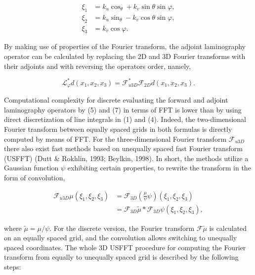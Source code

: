 \documentclass{article}
\begin{document}
\begin{equation}
\begin{aligned} \xi_1 &= k_u \cos_{\theta} + k_v \sin \theta \sin \varphi, \\ \xi_2 &= k_u \sin_{\theta} - k_v \cos \theta \sin \varphi, \\ \xi_3 &= k_v \cos \varphi. \end{aligned}
\tag{6}
\end{equation}

By making use of properties of the Fourier transform, the adjoint laminography operator can be calculated by replacing the 2D and 3D Fourier transforms with their adjoints and with reversing the operators order, namely,

\begin{equation}
\mathcal{L}_\varphi^* d(x_1, x_2, x_3) = \mathcal{F}_{u3D}^* \mathcal{F}_{2D} d(x_1, x_2, x_3).
\tag{7}
\end{equation}

Computational complexity for discrete evaluating the forward and adjoint laminography operators by (5) and (7) in terms of FFT is lower than by using direct discretization of line integrals in (1) and (4). Indeed, the two-dimensional Fourier transform between equally spaced grids in both formulas is directly computed by means of FFT. For the three-dimensional Fourier transform $\mathcal{F}_{u3D}$ there also exist fast methods based on unequally spaced fast Fourier transform (USFFT) (Dutt \& Rokhlin, 1993; Beylkin, 1998). In short, the methods utilize a Gaussian function $\psi$ exhibiting certain properties, to rewrite the transform in the form of convolution,

\begin{equation}
\begin{aligned} \mathcal{F}_{u3D} \mu(\xi_1, \xi_2, \xi_3) &= \mathcal{F}_{3D} \left( \frac{\mu}{\psi} \psi \right) (\xi_1, \xi_2, \xi_3) \\ &= \mathcal{F}_{3D} \tilde{\mu} * \mathcal{F}_{3D} \psi (\xi_1, \xi_2, \xi_3), \end{aligned}
\tag{8}
\end{equation}

where $\tilde{\mu} = \mu/\psi$. For the discrete version, the Fourier transform $\mathcal{F}\tilde{\mu}$ is calculated on an equally spaced grid, and the convolution allows switching to unequally spaced coordinates. The whole 3D USFFT procedure for computing the Fourier transform from equally to unequally spaced grid is described by the following steps:
\end{document}
